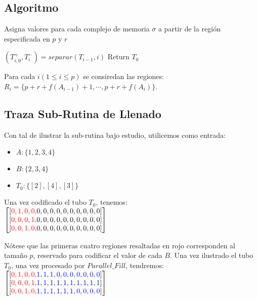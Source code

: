 \documentclass[12pt, letterpaper, twoside]{article}
\begin{document}
   \subsection{Algoritmo}
    \begin{algorithm}
        \caption{Asigna valores para cada complejo de memoria $\sigma$ a partir de la región especificada en $p$ y $r$}
        \label{ParallelFill}
        \begin{algorithmic}[1]
                \State $(T^+_{i,0}, T^-_i) = separar(T_{i-1}, i)$
                \EndFor
            \EndFor
            \State Return $T_0$
            \EndProcedure
        \end{algorithmic}
    \end{algorithm}
    \par Para cada $i (1\leq i \leq p)$ se consiredan las regiones:\\ $R_i=\{p+r+f(A_{i-1})+1,\cdots,p+r+f(A_i)\}$.
   \subsection{Traza Sub-Rutina de Llenado}
   \par Con tal de ilustrar la sub-rutina bajo estudio, utilicemos como entrada:
   \begin{itemize}
       \item $A: \{1, 2, 3, 4\}$
       \item $B: \{2, 3, 4\}$
       \item $T_0: \{[2], [4], [3]\}$
    \end{itemize}
    \par Una vez codificado el tubo $T_0$, tenemos: \\
    $
       \begin{bmatrix}
        [\textcolor{red}{0, 1, 0, 0,} 0, 0, 0, 0, 0, 0, 0, 0, 0, 0] \\
        [\textcolor{red}{0, 0, 0, 1,} 0, 0, 0, 0, 0, 0, 0, 0, 0, 0] \\
        [\textcolor{red}{0, 0, 1, 0,} 0, 0, 0, 0, 0, 0, 0, 0, 0, 0]
        \end{bmatrix}
    $
    \par Nótese que las primeras cuatro regiones resaltadas en rojo corresponden al tamaño $p$, reservado para codificar el valor de cada $B$. Una vez ilustrado el tubo $T_0$, una vez procesado por $Parallel\_Fill$, tendremos: \\
    $
        \begin{bmatrix}
            [\textcolor{red}{0, 1, 0, 0,} \textcolor{blue}{1, 1, 1, 0, 0, 0, 0, 0, 0, 0}] \\
            [\textcolor{red}{0, 0, 0, 1,} \textcolor{blue}{1, 1, 1, 1, 1, 1, 1, 1, 1, 1}] \\
            [\textcolor{red}{0, 0, 1, 0,} \textcolor{blue}{1, 1, 1, 1, 1, 1, 0, 0, 0, 0}]
        \end{bmatrix}
    $
\end{document}
